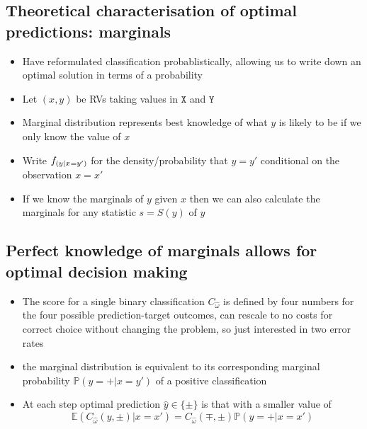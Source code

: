 \documentclass{article}
\newcommand{\TYPE}[1][X]{{\texttt{#1}}}
\newcommand{\TYPEY}{{\TYPE[Y]}}
\newcommand{\IN}{\TYPE}
\newcommand{\OUT}{\TYPEY}
\newcommand{\TWO}{\{\pm\}}
\newcommand{\dee}{\textrm{d}}
\newcommand{\Feature}{{x}}
\newcommand{\Target}{{y}}
\newcommand{\FeatureD}{{x'}}
\newcommand{\TargetD}{{y'}}
\newcommand{\Phase}{{\omega}}
\newcommand{\PhaseK}{{\widehat\Phase}}
\newcommand{\STAT}{{S}}
\newcommand{\Stat}{{s}}
\newcommand{\StatD}{{\Stat'}}
\newcommand{\SCORE}{{C}}
\newcommand{\Pred}[1][y]{{\hat{#1}}}
\begin{document}
\subsection{Theoretical characterisation of optimal predictions: marginals}
  \begin{itemize}
  \item
    Have reformulated classification probablistically, allowing us to write down an optimal solution in terms of a probability
    \item
      Let $(\Feature,\Target)$ be RVs taking values in $\IN$ and $\OUT$
    \item
      Marginal distribution represents best knowledge of what $\Target$ is likely to be if we only know the value of $\Feature$
    \item
        Write $\Marginal$ for the density/probability that $\Target=\TargetD$ conditional on the observation $\Feature=\FeatureD$
  \item
    If we know the marginals of $\Target$ given $\Feature$ then we can also calculate the marginals for any statistic $\Stat=\STAT(\Target)$ of $\Target$
  \end{itemize}


\subsection{Perfect knowledge of marginals allows for optimal decision making}
  \begin{itemize}
        \item
      The score for a single binary classification $\SCORE_\PhaseK$ is defined by four numbers for the four possible prediction-target outcomes, can rescale to no costs for correct choice without changing the problem, so just interested in two error rates
        \item
          the marginal distribution is equivalent to its corresponding marginal probability $\mathbb P(\Target=+|\Feature=\TargetD)$ of a positive classification
    \item
      At each step optimal prediction $\Pred\in\TWO$ is that with a smaller value of
          $$
          \mathbb E(\SCORE_\PhaseK(\Target,\pm)|\Feature=\FeatureD)=\SCORE_\PhaseK(\mp,\pm)\mathbb P(\Target=+|\Feature=\FeatureD)
          $$
      \end{itemize}
\end{document}

